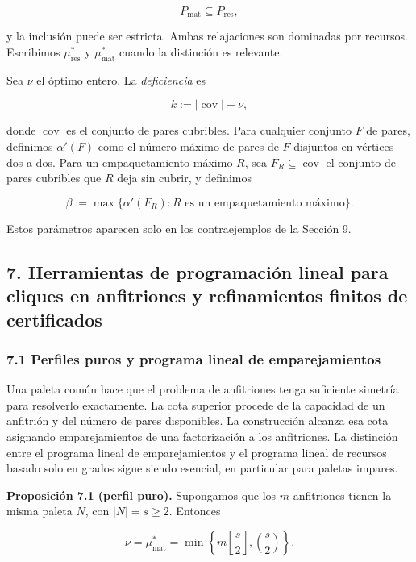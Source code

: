 \documentclass[spanish,11pt,a4paper]{article}
\begin{document}
\[
P_{\mathrm{mat}}\subseteq P_{\mathrm{res}},
\]

y la inclusión puede ser estricta. Ambas relajaciones son dominadas por
recursos. Escribimos \(\mu^*_{\mathrm{res}}\) y \(\mu^*_{\mathrm{mat}}\)
cuando la distinción es relevante.

Sea \(\nu\) el óptimo entero. La \emph{deficiencia} es

\[
k:=|\operatorname{cov}|-\nu,
\]

donde \(\operatorname{cov}\) es el conjunto de pares cubribles. Para
cualquier conjunto \(F\) de pares, definimos \(\alpha'(F)\) como el
número máximo de pares de \(F\) disjuntos en vértices dos a dos. Para un
empaquetamiento máximo \(R\), sea \(F_R\subseteq\operatorname{cov}\) el
conjunto de pares cubribles que \(R\) deja sin cubrir, y definimos

\[
\beta:=\max\{\alpha'(F_R): R\text{ es un empaquetamiento máximo}\}.
\]

Estos parámetros aparecen solo en los contraejemplos de la Sección 9.

\subsection{7. Herramientas de programación lineal para cliques en
anfitriones y refinamientos finitos de
certificados}\label{herramientas-de-programaciuxf3n-lineal-para-cliques-en-anfitriones-y-refinamientos-finitos-de-certificados}

\subsubsection{7.1 Perfiles puros y programa lineal de
emparejamientos}\label{perfiles-puros-y-programa-lineal-de-emparejamientos}

Una paleta común hace que el problema de anfitriones tenga suficiente
simetría para resolverlo exactamente. La cota superior procede de la
capacidad de un anfitrión y del número de pares disponibles. La
construcción alcanza esa cota asignando emparejamientos de una
factorización a los anfitriones. La distinción entre el programa lineal
de emparejamientos y el programa lineal de recursos basado solo en
grados sigue siendo esencial, en particular para paletas impares.

\textbf{Proposición 7.1 (perfil puro).} Supongamos que los \(m\)
anfitriones tienen la misma paleta \(N\), con \(|N|=s\ge2\). Entonces

\[
\nu
=
\mu^*_{\mathrm{mat}}
=
\min\left\{
m\left\lfloor\frac{s}{2}\right\rfloor,
\binom{s}{2}
\right\}.
\]
\end{document}
